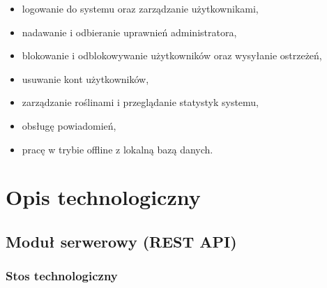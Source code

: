 \documentclass[12pt,a4paper]{article}
\begin{document}
\begin{itemize}[label=\textbullet, leftmargin=1.5cm]
    \item logowanie do systemu oraz zarz\k{a}dzanie u\.zytkownikami,
    \item nadawanie i odbieranie uprawnie\'n administratora,
    \item blokowanie i odblokowywanie u\.zytkownik\'ow oraz wysy\l{}anie ostrze\.ze\'n,
    \item usuwanie kont u\.zytkownik\'ow,
    \item zarz\k{a}dzanie ro\'slinami i przegl\k{a}danie statystyk systemu,
    \item obs\l{}ug\k{e} powiadomie\'n,
    \item prac\k{e} w trybie offline z lokaln\k{a} baz\k{a} danych.
\end{itemize}

\section{Opis technologiczny}

\subsection{Modu\l{} serwerowy (REST API)}

\subsubsection{Stos technologiczny}
\end{document}

